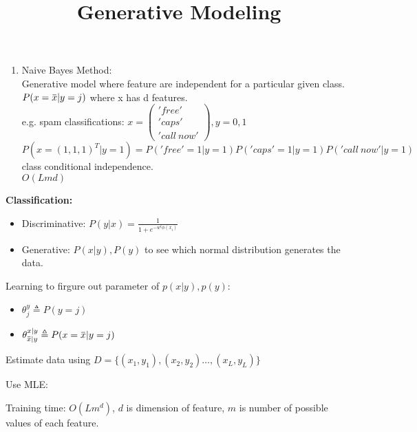 \documentclass[12pt]{article}
\newcommand{\overbar}[1]{\mkern 1.5mu\overline{\mkern-1.5mu#1\mkern-1.5mu}\mkern 1.5mu}
\begin{document}
\begin{enumerate}
            \item Naive Bayes Method:\\
            Generative model where feature are independent for a particular given class.\\
            $P(x = \overbar{x} | y = j)$ where x has d features.\\
            e.g. spam classifications: $ x = \begin{pmatrix}
                'free' \\ 'caps' \\ 'call \ now'
            \end{pmatrix}, y = 0,1$\\
            $P(x = (1,1,1)^T | y = 1) = P('free' = 1 | y = 1)P('caps' = 1| y = 1)P('call \ now' | y = 1)$\\
            class conditional independence.\\
            $O(Lmd)$
        \end{enumerate}

        \title{Generative Modeling}
        \maketitle

        \textbf{Classification:} 
        \begin{itemize}
            \item Discriminative: $P(y|x) = \frac{1}{1 + e^{-w^t\phi(x_i)}}$
            \item Generative: $P(x | y), P(y)$ to see which normal distribution generates the data.
        \end{itemize}
        
        Learning to firgure out parameter of $p(x|y), p(y)$:
        
        \begin{itemize}
            \item $\theta_j^y \triangleq P(y = j)$
            \item $\theta_{\overbar{x} | y}^{x|y} \triangleq P(x = \overbar{x} | y = j)$
        \end{itemize}
        
        Estimate data using $D = \{(x_1, y_1), (x_2, y_2) \dots, (x_L, y_L)\}$
        
        Use MLE:
        
        Training time: $O(Lm^d)$, $d$ is dimension of feature, $m$ is number of possible values of each feature.
\end{document}
